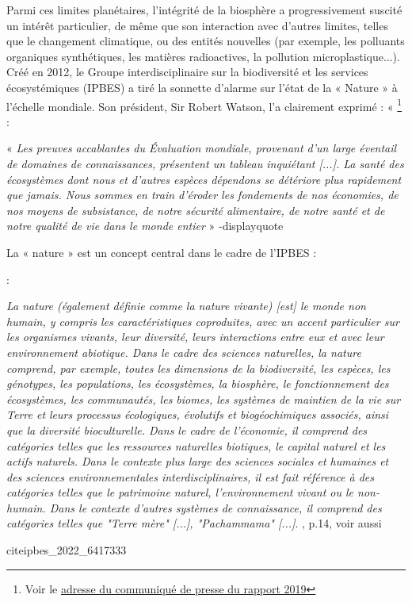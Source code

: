 Parmi ces limites planétaires, l'intégrité de la biosphère a progressivement suscité un intérêt particulier, de même que son interaction avec d'autres limites, telles que le changement climatique, ou des entités nouvelles (par exemple, les polluants organiques synthétiques, les matières radioactives, la pollution microplastique...). Créé en 2012, le Groupe interdisciplinaire sur la biodiversité et les services écosystémiques (IPBES) a tiré la sonnette d'alarme sur l'état de la « Nature » à l'échelle mondiale. Son président, Sir Robert Watson, l'a clairement exprimé : « \footnote{Voir le \href{https://www.ipbes.net/news/Media-Release-Global-Assessment}{adresse du communiqué de presse du rapport 2019}} :
\begin{displayquote}
« \textit{Les preuves accablantes du \cite{ipbes_2022_6417333} Évaluation mondiale, provenant d'un large éventail de domaines de connaissances, présentent un tableau inquiétant [...]. La santé des écosystèmes dont nous et d'autres espèces dépendons se détériore plus rapidement que jamais. Nous sommes en train d'éroder les fondements de nos économies, de nos moyens de subsistance, de notre sécurité alimentaire, de notre santé et de notre qualité de vie dans le monde entier} »
\n-{displayquote}

La « nature » est un concept central dans le cadre de l'IPBES \citep{ipbes_2022_6417333} :

\begin{displayquote}
\citep{ipbes_2022_6417333} : \begin{displayquote} \textit{La nature (également définie comme la nature vivante) [est] le monde non humain, y compris les caractéristiques coproduites, avec un accent particulier sur les organismes vivants, leur diversité, leurs interactions entre eux et avec leur environnement abiotique. Dans le cadre des sciences naturelles, la nature comprend, par exemple, toutes les dimensions de la biodiversité, les espèces, les génotypes, les populations, les écosystèmes, la biosphère, le fonctionnement des écosystèmes, les communautés, les biomes, les systèmes de maintien de la vie sur Terre et leurs processus écologiques, évolutifs et biogéochimiques associés, ainsi que la diversité bioculturelle. Dans le cadre de l'économie, il comprend des catégories telles que les ressources naturelles biotiques, le capital naturel et les actifs naturels. Dans le contexte plus large des sciences sociales et humaines et des sciences environnementales interdisciplinaires, il est fait référence à des catégories telles que le patrimoine naturel, l'environnement vivant ou le non-humain. Dans le contexte d'autres systèmes de connaissance, il comprend des catégories telles que "Terre mère" [...], "Pachammama" [...]}.
\hspace*{\fill} \small{\cite{ipbes_2022_6417333}, p.14, voir aussi \cite{DIAZ20151}}
\small{cite{ipbes_2022_6417333}

}
\end{displayquote}
\end{displayquote}
\end{displayquote}
